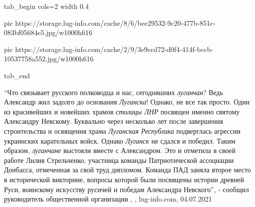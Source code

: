 \ifcmt
  tab_begin cols=2
		 width 0.4

     pic https://storage.lug-info.com/cache/8/6/bee29532-9c20-477b-851c-083bf05684e5.jpg/w1000h616

     pic https://storage.lug-info.com/cache/2/9/3e9ccd72-d0f4-414f-bccb-10537758a552.jpg/w1000h616

  tab_end
\fi

\enquote{Что связывает русского полководца и нас, сегодняшних \emph{луганчан}? Ведь Александр
жил задолго до основания \emph{Луганска}! Однако, не все так просто. Один из
красивейших и новейших храмов \emph{столицы ЛНР} посвящен именно святому Александру
Невскому. Буквально через несколько лет после завершения строительства и
освящения храма \emph{Луганская Республика} подверглась агрессии украинских
карательных войск. Однако \emph{Луганск} не сдался и победил. Таким образом, \emph{луганчане}
выстояли вместе с Александром. Это и отметила в своей работе Лилия Стрельченко,
участница команды Патриотической ассоциации Донбасса, отмеченная за свой труд
дипломом. Команда ПАД заняла второе место в исторической викторине, вопросы
которой были посвящены истории древней Руси, воинскому искусству русичей и
победам Александра Невского}, - сообщил руководитель общественной организации
, , lug-info.com,
04.07.2021
